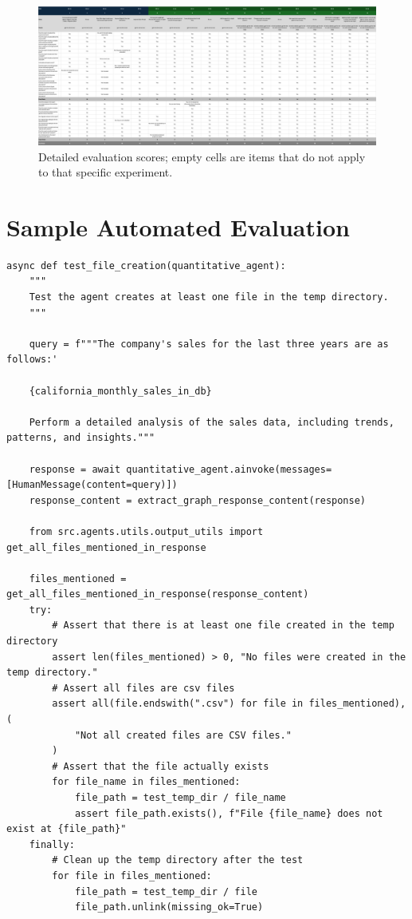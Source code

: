 \documentclass[a4paper]{report}
\begin{document}
\begin{figure}
    \centering
    \includegraphics[width=\textheight]{images/evals-detail.png}
    \caption{Detailed evaluation scores; empty cells are items that do not apply to that specific experiment.}
    \label{fig:evals-detailed}
\end{figure}

\chapter{Sample Automated Evaluation}
\label{annex:sample-eval}

\begin{verbatim}
async def test_file_creation(quantitative_agent):
    """
    Test the agent creates at least one file in the temp directory.
    """

    query = f"""The company's sales for the last three years are as follows:' 
    
    {california_monthly_sales_in_db}
    
    Perform a detailed analysis of the sales data, including trends, patterns, and insights."""

    response = await quantitative_agent.ainvoke(messages=[HumanMessage(content=query)])
    response_content = extract_graph_response_content(response)

    from src.agents.utils.output_utils import get_all_files_mentioned_in_response

    files_mentioned = get_all_files_mentioned_in_response(response_content)
    try:
        # Assert that there is at least one file created in the temp directory
        assert len(files_mentioned) > 0, "No files were created in the temp directory."
        # Assert all files are csv files
        assert all(file.endswith(".csv") for file in files_mentioned), (
            "Not all created files are CSV files."
        )
        # Assert that the file actually exists
        for file_name in files_mentioned:
            file_path = test_temp_dir / file_name
            assert file_path.exists(), f"File {file_name} does not exist at {file_path}"
    finally:
        # Clean up the temp directory after the test
        for file in files_mentioned:
            file_path = test_temp_dir / file
            file_path.unlink(missing_ok=True)
\end{verbatim}
\end{document}
